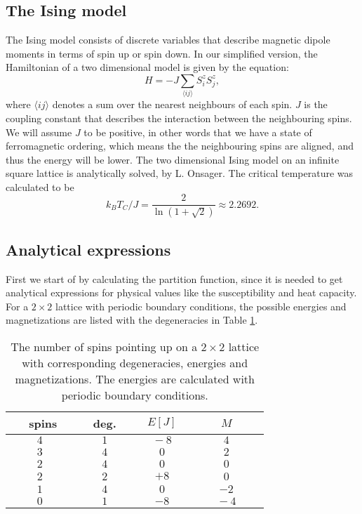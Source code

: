 \documentclass{article}
\begin{document}
\subsection{The Ising model }\label{const_mot}

The Ising model consists of discrete variables that describe magnetic dipole moments in terms of spin up or spin down. In our simplified version, the Hamiltonian of a  two dimensional  model is given by the equation:
\begin{equation}\label{eq:Hamiltonian}
H = -J\sum_{\langle ij \rangle}S^z_i S^z_j,
\end{equation}
where $\langle ij \rangle$ denotes a sum over the nearest neighbours of each spin. $J$ is the coupling constant that describes the interaction between the neighbouring spins. We will assume $J$ to be positive, in other words that we have a state of ferromagnetic ordering, which means the the neighbouring spins are aligned, and thus the energy will be lower. 
The two dimensional Ising model on an infinite square lattice is  analytically solved, by L. Onsager. The critical temperature was calculated to be
\begin{equation}
k_B T_C / J = \frac{2}{\ln (1 + \sqrt{2})} \approx 2.2692.
\end{equation}

\subsection{Analytical expressions}\label{const_mot}

First we start of by calculating the partition function, since it  is needed to get analytical expressions for physical values like the susceptibility and heat capacity.
For a $2 \times 2$ lattice with periodic boundary conditions, the possible energies and magnetizations are listed with the degeneracies in Table 
\ref{table:2times2}. 

\begin{table}[]
\caption{The number of spins pointing up on a $2\times 2$ lattice with corresponding degeneracies, energies and magnetizations. The energies are calculated with periodic boundary conditions.}
\label{table:2times2}
\centering
\begin{tabular}{@{}cccc@{}}
\toprule
$\quad$\ spins$\quad$ & deg. & $E [J]$   & $M$  \\ \midrule
$4$     & $\qquad 1\qquad$  & $\quad-8\quad$ & $4$  \\
$3$     & $4$  & $0$   & $2$  \\
$2$     & $4$  & $0$   & $0$  \\
$2$     & $2$  & $+8$ & $0$  \\
$1$     & $4$  & $0$   & $-2$ \\
$0$     & $1$  & $-8$ & $\qquad -4\qquad$ \\ 
\bottomrule
\end{tabular}
\end{table}
\end{document}
